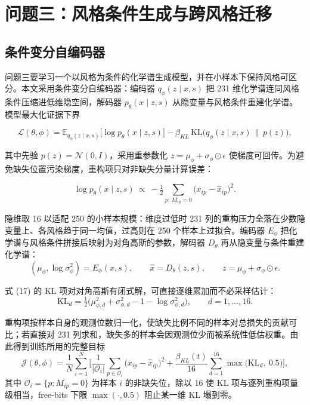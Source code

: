 \documentclass[zihao=-4,a4paper,UTF8,fontset=none]{ctexart}
\begin{document}
\section{问题三：风格条件生成与跨风格迁移}

\subsection{条件变分自编码器}

问题三要学习一个以风格为条件的化学谱生成模型，并在小样本下保持风格可区分。本文采用条件变分自编码器\cite{b17}：编码器 $q_\phi(z\mid x,s)$ 把 231 维化学谱连同风格条件压缩进低维隐空间，解码器 $p_\theta(x\mid z,s)$ 从隐变量与风格条件重建化学谱。模型最大化证据下界

\begin{equation}
\mathcal{L}(\theta,\phi)=\mathbb{E}_{q_\phi(z\mid x,s)}\big[\log p_\theta(x\mid z,s)\big]-\beta_{KL}\,\mathrm{KL}\!\big(q_\phi(z\mid x,s)\,\big\|\,p(z)\big),
\end{equation}

其中先验 $p(z)=\mathcal{N}(0,I)$，采用重参数化 $z=\mu_\phi+\sigma_\phi\odot\epsilon$ 使梯度可回传。为避免缺失位置污染梯度，重构项只对非缺失分量计算误差：

\begin{equation}
\log p_\theta(x\mid z,s)\ \propto\ -\tfrac12\sum_{p:\,M_{ip}=0}\big(x_{ip}-\hat x_{ip}\big)^2.
\end{equation}

隐维取 16 以适配 250 的小样本规模：维度过低时 231 列的重构压力全落在少数隐变量上、各风格趋于同一均值，过高则在 250 个样本上过拟合。编码器 $E_\phi$ 把化学谱与风格条件拼接后映射为对角高斯的参数，解码器 $D_\theta$ 再从隐变量与条件重建化学谱：
\begin{equation}
(\mu_\phi,\log\sigma^2_\phi)=E_\phi(x,s),\qquad \hat x=D_\theta(z,s),\qquad z=\mu_\phi+\sigma_\phi\odot\epsilon.
\end{equation}

式 (17) 的 KL 项对对角高斯有闭式解，可直接逐维累加而不必采样估计：
\begin{equation}
\mathrm{KL}_d=\tfrac12\Big(\mu_{\phi,d}^2+\sigma_{\phi,d}^2-1-\log\sigma_{\phi,d}^2\Big),\qquad d=1,\dots,16.
\end{equation}

重构项按样本自身的观测位数归一化，使缺失比例不同的样本对总损失的贡献可比；若直接对 231 列求和，缺失多的样本会因观测位少而被系统性低估权重。由此得到训练所用的完整目标
\begin{equation}
\mathcal{J}(\theta,\phi)=\frac{1}{N}\sum_{i=1}^{N}\Bigg[\frac{1}{\lvert\mathcal{O}_i\rvert}\sum_{p\in\mathcal{O}_i}\big(x_{ip}-\hat x_{ip}\big)^2+\frac{\beta_{KL}(t)}{16}\sum_{d=1}^{16}\max\big(\mathrm{KL}_d,\ 0.5\big)\Bigg],
\end{equation}
其中 $\mathcal{O}_i=\{p:M_{ip}=0\}$ 为样本 $i$ 的非缺失位，除以 16 使 KL 项与逐列重构项量级相当，free-bits 下限 $\max(\cdot,0.5)$ 阻止某一维 KL 塌到零。
\end{document}

